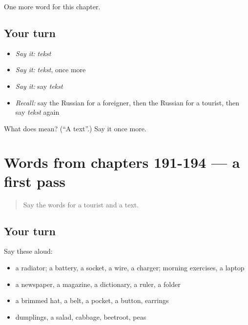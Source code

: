 \begin{grammarlens}[title={What you've built}]
One more word for this chapter.
\end{grammarlens}

\subsection*{Your turn}
\begin{itemize}
\raggedright
  \item \emph{Say it:} \emph{tekst}
  \item \emph{Say it:} \emph{tekst}, once more
  \item \emph{Say it:} say \emph{tekst}
  \item \emph{Recall:} say the Russian for a foreigner, then the Russian for a tourist, then say \emph{tekst} again
\end{itemize}

\begin{tcolorbox}[breakable,colback=teal!4,colframe=teal!35!black,title={Before you move on}]
What does  mean? (\textquotedblleft{}A text\textquotedblright{}.) Say it once more.
\end{tcolorbox}
\section[(dialogue)]{Words from chapters 191-194 — a first pass}

\label{lesson:RU-R199-first-pass-words-from-chapters-191-194}



\begin{quote}
Say the words for a tourist and a text.
\end{quote}

\subsection*{Your turn}
Say these aloud:

\begin{itemize}
\raggedright
  \item a radiator; a battery, a socket, a wire, a charger; morning exercises, a laptop
  \item a newspaper, a magazine, a dictionary, a ruler, a folder
  \item a brimmed hat, a belt, a pocket, a button, earrings
  \item dumplings, a salad, cabbage, beetroot, peas
\end{itemize}

